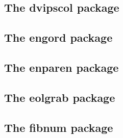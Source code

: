 \documentclass[a4paper,12pt]{article}
\makeatletter
\newcommand*{\xpackage}[1]{\textsf{#1}}
\newcommand*{\xfile}[1]{\texttt{#1}}
\newcommand*{\tocinclude}[1]{%
  \setcounter{tocdepth}{3}%
  \begingroup
    \makeatletter
    \def\@prj{#1}%
    \let\contentsline\foreign@contentsline
  \endgroup
}
\def\foreign@contentsline#1#2#3#4{%
  \ifx\\#4\\%
    \csname l@#1\endcsname{#2}{#3}%
  \else
    \ifHy@linktocpage
      \csname l@#1\endcsname{{#2}}{%
        \hyper@linkfile{#3}{\@prj.pdf}{#4}%
      }%
    \else
      \csname l@#1\endcsname{%
        \hyper@linkfile{#2}{\@prj.pdf}{#4}%
      }{#3}%
    \fi
  \fi
}%
\newcommand*{\pkgsectformat}[1]{%
  \texorpdfstring{%
    \textcolor{link}{The} %
    \xpackage{#1} %
    \textcolor{link}{package}%
  }{#1}%
}
\makeatother
\begin{document}
\newpage
\subsection{\pkgsectformat{dvipscol}}
\label{dvipscol}
\begin{abstract}
Color support for dvips in \xfile{dvips.def} involves the
color stack of dvips. The package tries to remove unnecessary
uses of the stack to avoid the error ``out of coor stack space''.
\end{abstract}
\tocinclude{dvipscol}


\newpage
\subsection{\pkgsectformat{engord}}
\label{engord}
\begin{abstract}
The package generates the suffix of English ordinal numbers.
It can be used with plain and \LaTeX\ formats.
\end{abstract}
\tocinclude{engord}

\newpage
\subsection{\pkgsectformat{enparen}}
\label{enparen}
\begin{abstract}
The package defines macros to set parentheses that automatically
change the symbols from inner to outer fences.
\end{abstract}
\tocinclude{enparen}

\newpage
\subsection{\pkgsectformat{eolgrab}}
\label{eolgrab}
\begin{abstract}
This package implements a generic argument grabber
to catch an argument that is delimited by the line end.
\end{abstract}
\tocinclude{eolgrab}

\newpage
\subsection{\pkgsectformat{fibnum}}
\label{fibnum}
\begin{abstract}
The package \xpackage{fibnum} provides expandable fibonacci
numbers for both  and .
\end{abstract}
\tocinclude{fibnum}
\end{document}
